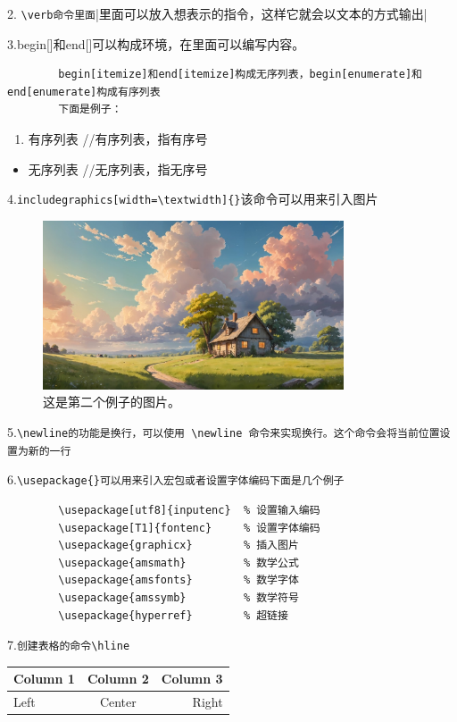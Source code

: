\documentclass{article}
\begin{document}
	2. \verb|\verb命令里面||里面可以放入想表示的指令，这样它就会以文本的方式输出|
	
	3.begin[]和end[]可以构成环境，在里面可以编写内容。
	\begin{verbatim}
		begin[itemize]和end[itemize]构成无序列表，begin[enumerate]和end[enumerate]构成有序列表
		下面是例子：
	\end{verbatim}
	\begin{enumerate}
		\item 有序列表
		//有序列表，指有序号
	\end{enumerate}%
	\begin{itemize}
		\item 无序列表
		//无序列表，指无序号
	\end{itemize}%
	
	4.\verb|includegraphics[width=\textwidth]{}|该命令可以用来引入图片
	\begin{figure}[H]
		\centering %
		\includegraphics[height = 5cm, width=\textwidth]{"example1.png"}
		\caption{这是第二个例子的图片。} %
		\label{fig:example} %
	\end{figure}
	
	5.\verb|\newline的功能是换行，可以使用 \newline 命令来实现换行。这个命令会将当前位置设置为新的一行|
	
	6.\verb|\usepackage{}可以用来引入宏包或者设置字体编码下面是几个例子|\begin{verbatim}
		\usepackage[utf8]{inputenc}  % 设置输入编码
		\usepackage[T1]{fontenc}     % 设置字体编码
		\usepackage{graphicx}        % 插入图片
		\usepackage{amsmath}         % 数学公式
		\usepackage{amsfonts}        % 数学字体
		\usepackage{amssymb}         % 数学符号
		\usepackage{hyperref}        % 超链接
	\end{verbatim}
	
	7.\verb|创建表格的命令\hline|
	
	\begin{tabular}{|l|c|r|}
		\hline
		Column 1 & Column 2 & Column 3 \\
		\hline
		Left & Center & Right \\
		\hline
	\end{tabular}
	\newline
	
\end{document}
